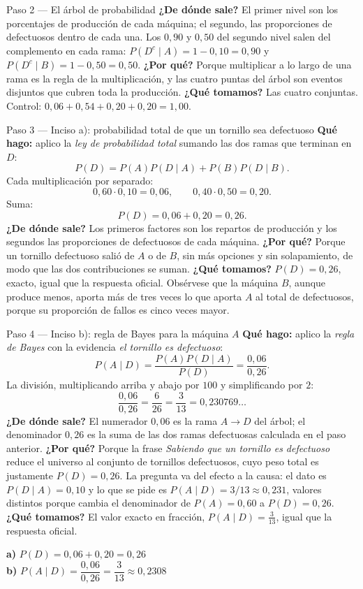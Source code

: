 \documentclass[11pt]{article}
\begin{document}
\begin{sol}
\begin{paso}{Paso 2 --- El árbol de probabilidad}
\textbf{¿De dónde sale?} El primer nivel son los porcentajes de producción de cada máquina; el segundo, las proporciones de defectuosos dentro de cada una. Los $0,90$ y $0,50$ del segundo nivel salen del complemento en cada rama: $P(D^{c}\mid A)=1-0,10=0,90$ y $P(D^{c}\mid B)=1-0,50=0,50$.
\textbf{¿Por qué?} Porque multiplicar a lo largo de una rama es la regla de la multiplicación, y las cuatro puntas del árbol son eventos disjuntos que cubren toda la producción.
\textbf{¿Qué tomamos?} Las cuatro conjuntas. Control: $0,06+0,54+0,20+0,20=1,00$.
\end{paso}

\begin{paso}{Paso 3 --- Inciso a): probabilidad total de que un tornillo sea defectuoso}
\textbf{Qué hago:} aplico la \emph{ley de probabilidad total} sumando las dos ramas que terminan en $D$:
\[
P(D)=P(A)P(D\mid A)+P(B)P(D\mid B).
\]
Cada multiplicación por separado:
\[
0,60\cdot 0,10=0,06,\qquad 0,40\cdot 0,50=0,20 .
\]
Suma:
\[
P(D)=0,06+0,20=0,26 .
\]
\textbf{¿De dónde sale?} Los primeros factores son los repartos de producción y los segundos las proporciones de defectuosos de cada máquina.
\textbf{¿Por qué?} Porque un tornillo defectuoso salió de $A$ o de $B$, sin más opciones y sin solapamiento, de modo que las dos contribuciones se suman.
\textbf{¿Qué tomamos?} $P(D)=0,26$, exacto, igual que la respuesta oficial. Obsérvese que la máquina $B$, aunque produce menos, aporta más de tres veces lo que aporta $A$ al total de defectuosos, porque su proporción de fallos es cinco veces mayor.
\end{paso}

\begin{paso}{Paso 4 --- Inciso b): regla de Bayes para la máquina $A$}
\textbf{Qué hago:} aplico la \emph{regla de Bayes} con la evidencia \emph{el tornillo es defectuoso}:
\[
P(A\mid D)=\frac{P(A)P(D\mid A)}{P(D)}=\frac{0,06}{0,26}.
\]
La división, multiplicando arriba y abajo por $100$ y simplificando por $2$:
\[
\frac{0,06}{0,26}=\frac{6}{26}=\frac{3}{13}=0,230769\ldots
\]
\textbf{¿De dónde sale?} El numerador $0,06$ es la rama $A\to D$ del árbol; el denominador $0,26$ es la suma de las dos ramas defectuosas calculada en el paso anterior.
\textbf{¿Por qué?} Porque la frase \emph{Sabiendo que un tornillo es defectuoso} reduce el universo al conjunto de tornillos defectuosos, cuyo peso total es justamente $P(D)=0,26$. La pregunta va del efecto a la causa: el dato es $P(D\mid A)=0,10$ y lo que se pide es $P(A\mid D)=3/13\approx 0,231$, valores distintos porque cambia el denominador de $P(A)=0,60$ a $P(D)=0,26$.
\textbf{¿Qué tomamos?} El valor exacto en fracción, $P(A\mid D)=\tfrac{3}{13}$, igual que la respuesta oficial.
\end{paso}

\begin{resp}
\textbf{a)} $P(D)=0,06+0,20=0,26$\\
\textbf{b)} $P(A\mid D)=\dfrac{0,06}{0,26}=\dfrac{3}{13}\approx 0,2308$
\end{resp}

\end{sol}
\end{document}
